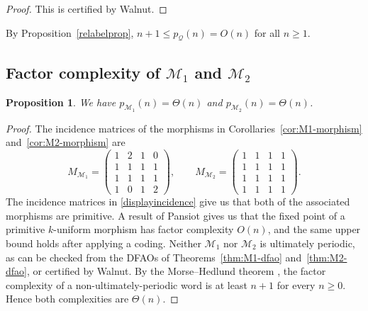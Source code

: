 \documentclass[12pt,reqno]{article}
\theoremstyle{plain}
\newtheorem{proposition}[theorem]{Proposition}
\theoremstyle{definition}
\theoremstyle{remark}
\begin{document}
\begin{proof}
 This is certified by Walnut. 
\end{proof}

 By Proposition~\ref{relabelprop}, $n+1\le p_{\mathcal{Q}}(n)=O(n)$ for all $n\ge 1$.

\subsection{\texorpdfstring{Factor complexity of $\mathcal{M}_{1}$ and $\mathcal{M}_{2}$}{Factor complexity of M1 and M2}}

\begin{proposition}
We have $p_{\mathcal{M}_{1}}(n) = \Theta(n)$ and $p_{\mathcal{M}_{2}}(n) = \Theta(n)$.
\end{proposition}

\begin{proof}
 The incidence matrices of the morphisms in Corollaries~\ref{cor:M1-morphism} and~\ref{cor:M2-morphism} are
\begin{equation}\label{displayincidence}
 M_{\mathcal{M}_{1}} = \begin{pmatrix}
 1 & 2 & 1 & 0 \\
 1 & 1 & 1 & 1 \\
 1 & 1 & 1 & 1 \\
 1 & 0 & 1 & 2
 \end{pmatrix}, \qquad
 M_{\mathcal{M}_{2}} = \begin{pmatrix}
 1 & 1 & 1 & 1 \\
 1 & 1 & 1 & 1 \\
 1 & 1 & 1 & 1 \\
 1 & 1 & 1 & 1
 \end{pmatrix}. 
\end{equation} 
 The incidence matrices in \eqref{displayincidence} give us that both of the associated morphisms are primitive. A result of Pansiot 
 \cite{Pansiot1984} gives us that the fixed point of a primitive $k$-uniform morphism has factor complexity 
 $O(n)$, and the same upper bound holds after applying a coding. Neither $\mathcal{M}_{1}$ nor $\mathcal{M}_{2}$ is ultimately 
 periodic, as can be checked from the DFAOs of Theorems~\ref{thm:M1-dfao} and~\ref{thm:M2-dfao}, or
 certified by Walnut. By the Morse--Hedlund theorem \cite[Theorem~10.2.6]{AlloucheShallit2003}, the factor complexity of 
 a non-ultimately-periodic
 word is at least $n+1$ for every $n\ge 0$. Hence both complexities are $\Theta(n)$.
\end{proof}
\end{document}
